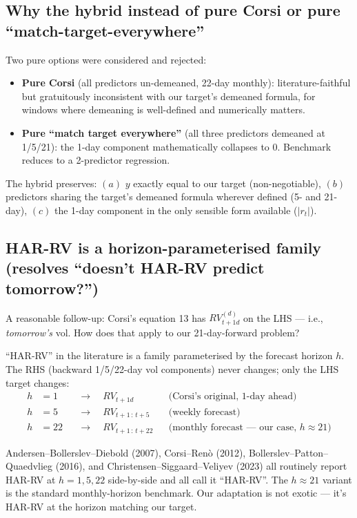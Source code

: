\documentclass[11pt]{article}
\begin{document}
\subsection*{Why the hybrid instead of pure Corsi or pure ``match-target-everywhere''}

Two pure options were considered and rejected:

\begin{itemize}[leftmargin=*]
  \item \textbf{Pure Corsi} (all predictors un-demeaned, 22-day monthly): literature-faithful but gratuitously inconsistent with our target's demeaned formula, for windows where demeaning is well-defined and numerically matters.
  \item \textbf{Pure ``match target everywhere''} (all three predictors demeaned at 1/5/21): the 1-day component mathematically collapses to 0. Benchmark reduces to a 2-predictor regression.
\end{itemize}

The hybrid preserves: $(a)$ $y$ exactly equal to our target (non-negotiable), $(b)$ predictors sharing the target's demeaned formula wherever defined (5- and 21-day), $(c)$ the 1-day component in the only sensible form available ($|r_t|$).

\subsection*{HAR-RV is a horizon-parameterised family (resolves ``doesn't HAR-RV predict tomorrow?'')}

A reasonable follow-up: Corsi's equation 13 has $RV^{(d)}_{t+1d}$ on the LHS --- i.e., \emph{tomorrow's} vol. How does that apply to our 21-day-forward problem?

``HAR-RV'' in the literature is a family parameterised by the forecast horizon $h$. The RHS (backward 1/5/22-day vol components) never changes; only the LHS target changes:
\begin{align}
h &= 1   && \to\quad RV_{t+1d}            && \text{(Corsi's original, 1-day ahead)} \\
h &= 5   && \to\quad RV_{t+1\,:\,t+5}       && \text{(weekly forecast)} \\
h &= 22  && \to\quad RV_{t+1\,:\,t+22}      && \text{(monthly forecast --- our case, $h \approx 21$)}
\end{align}

Andersen--Bollerslev--Diebold (2007), Corsi--Renò (2012), Bollerslev--Patton--Quaedvlieg (2016), and Christensen--Siggaard--Veliyev (2023) all routinely report HAR-RV at $h=1, 5, 22$ side-by-side and all call it ``HAR-RV''. The $h \approx 21$ variant is the standard monthly-horizon benchmark. Our adaptation is not exotic --- it's HAR-RV at the horizon matching our target.
\end{document}
